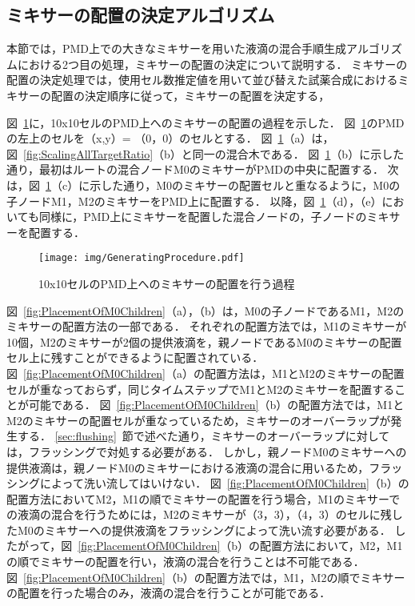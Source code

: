 \newpage

\subsection{ミキサーの配置の決定アルゴリズム}
本節では，PMD上での大きなミキサーを用いた液滴の混合手順生成アルゴリズムにおける2つ目の処理，ミキサーの配置の決定について説明する．
ミキサーの配置の決定処理では，使用セル数推定値を用いて並び替えた試薬合成におけるミキサーの配置の決定順序に従って，ミキサーの配置を決定する，

図~\ref{fig:GeneratingProcedure}に，10x10セルのPMD上へのミキサーの配置の過程を示した．
図~\ref{fig:GeneratingProcedure}のPMDの左上のセルを（x,y）= （0，0）のセルとする．
図~\ref{fig:GeneratingProcedure}（a）は，図~\ref{fig:ScalingAllTargetRatio}（b）と同一の混合木である．
図~\ref{fig:GeneratingProcedure}（b）に示した通り，最初はルートの混合ノードM0のミキサーがPMDの中央に配置する．
次は，図~\ref{fig:GeneratingProcedure}（c）に示した通り，M0のミキサーの配置セルと重なるように，M0の子ノードM1，M2のミキサーをPMD上に配置する．
以降，図~\ref{fig:GeneratingProcedure}（d），（e）においても同様に，PMD上にミキサーを配置した混合ノードの，子ノードのミキサーを配置する．

\begin{figure}[tbp]
    \centering\texttt{[image: img/GeneratingProcedure.pdf]}
 \caption{10x10セルのPMD上へのミキサーの配置を行う過程}\label{fig:GeneratingProcedure}
\end{figure}

図~\ref{fig:PlacementOfM0Children}（a），（b）は，M0の子ノードであるM1，M2のミキサーの配置方法の一部である．
それぞれの配置方法では，M1のミキサーが10個，M2のミキサーが2個の提供液滴を，親ノードであるM0のミキサーの配置セル上に残すことができるように配置されている．
図~\ref{fig:PlacementOfM0Children}（a）の配置方法は，M1とM2のミキサーの配置セルが重なっておらず，同じタイムステップでM1とM2のミキサーを配置することが可能である．
図~\ref{fig:PlacementOfM0Children}（b）の配置方法では，M1とM2のミキサーの配置セルが重なっているため，ミキサーのオーバーラップが発生する．
\ref{sec:flushing}~節で述べた通り，ミキサーのオーバーラップに対しては，フラッシングで対処する必要がある．
しかし，親ノードM0のミキサーへの提供液滴は，親ノードM0のミキサーにおける液滴の混合に用いるため，フラッシングによって洗い流してはいけない．
図~\ref{fig:PlacementOfM0Children}（b）の配置方法においてM2，M1の順でミキサーの配置を行う場合，M1のミキサーでの液滴の混合を行うためには，M2のミキサーが（3，3），（4，3）のセルに残したM0のミキサーへの提供液滴をフラッシングによって洗い流す必要がある．
したがって，図~\ref{fig:PlacementOfM0Children}（b）の配置方法において，M2，M1の順でミキサーの配置を行い，液滴の混合を行うことは不可能である．
図~\ref{fig:PlacementOfM0Children}（b）の配置方法では，M1，M2の順でミキサーの配置を行った場合のみ，液滴の混合を行うことが可能である．

